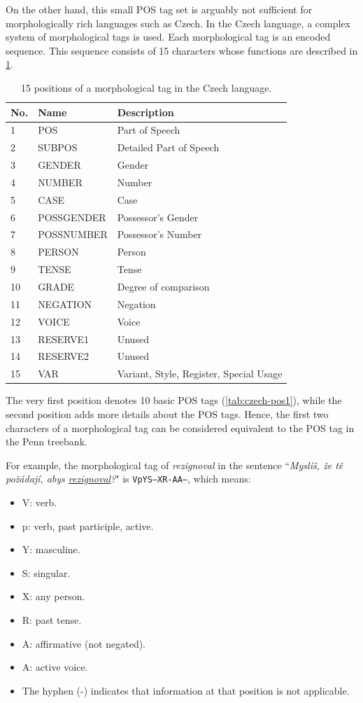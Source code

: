 On the other hand, this small POS tag set is arguably not sufficient for morphologically rich languages such as Czech. 
In the Czech language, a complex system of morphological tags is used.
Each morphological tag is an encoded sequence.
This sequence consists of 15 characters whose functions are described in \cref{tab:czech-pos}.

\begin{table}[t]
\small
\centering
\begin{tabular}{| l | l | l |} 
\hline
    No. & Name & Description \\
\hline
     1 & POS & Part of Speech \\
     2 & SUBPOS & Detailed Part of Speech \\
     3 & GENDER & Gender \\
     4 & NUMBER & Number \\
     5 & CASE & Case \\
     6 & POSSGENDER & Possessor's Gender \\
     7 & POSSNUMBER & Possessor's Number \\
     8 & PERSON & Person \\
     9 & TENSE & Tense \\
     10 & GRADE & Degree of comparison \\
     11 & NEGATION & Negation \\
     12 & VOICE & Voice \\
     13 & RESERVE1 & Unused \\
     14 & RESERVE2 & Unused \\
     15 & VAR & Variant, Style, Register, Special Usage  \\
\hline
\end{tabular}
\caption{15 positions of a morphological tag in the Czech language.}
\label{tab:czech-pos}
\end{table}

The very first position denotes 10 basic POS tags (\cref{tab:czech-pos1}), while the second position adds more details about the POS tags.
Hence, the first two characters of a morphological tag can be considered equivalent to the POS tag in the Penn treebank.

For example, the morphological tag of \textit{rezignoval} in the sentence ``\textit{Myslíš, že tě požádají, abys \underline{rezignoval}?}" is \texttt{VpYS---XR-AA---}, which means:
\begin{itemize}
    \item V: verb.
    \item p: verb, past participle, active.
    \item Y: masculine.
    \item S: singular.
    \item X: any person.
    \item R: past tense.
    \item A: affirmative (not negated).
    \item A: active voice.
    \item The hyphen (-) indicates that information at that position is not applicable.
\end{itemize}

